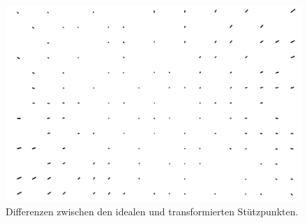 \begin{figure}[H]
	\includegraphics[width=\textwidth]{Images/Auswertung/Testbild1/Radial_onlydiffs.jpg}
	\caption{Differenzen zwischen den idealen und transformierten Stützpunkten.}
	\label{fig:diffsResult}
\end{figure}


